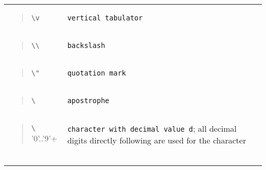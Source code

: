 \begin{longtable}[]{@{}ll@{}}
\begin{minipage}[t]{0.47\columnwidth}\raggedright
\begin{quote}
\texttt{\textbackslash{}v}
\end{quote}\strut
\end{minipage} & \begin{minipage}[t]{0.47\columnwidth}\raggedright
\texttt{vertical\ tabulator}\strut
\end{minipage}\tabularnewline
\begin{minipage}[t]{0.47\columnwidth}\raggedright
\begin{quote}
\texttt{\textbackslash{}\textbackslash{}}
\end{quote}\strut
\end{minipage} & \begin{minipage}[t]{0.47\columnwidth}\raggedright
\texttt{backslash}\strut
\end{minipage}\tabularnewline
\begin{minipage}[t]{0.47\columnwidth}\raggedright
\begin{quote}
\texttt{\textbackslash{}"}
\end{quote}\strut
\end{minipage} & \begin{minipage}[t]{0.47\columnwidth}\raggedright
\texttt{quotation\ mark}\strut
\end{minipage}\tabularnewline
\begin{minipage}[t]{0.47\columnwidth}\raggedright
\begin{quote}
\texttt{\textbackslash{}\textquotesingle{}}
\end{quote}\strut
\end{minipage} & \begin{minipage}[t]{0.47\columnwidth}\raggedright
\texttt{apostrophe}\strut
\end{minipage}\tabularnewline
\begin{minipage}[t]{0.47\columnwidth}\raggedright
\begin{quote}
\texttt{\textbackslash{}} '0'..'9'+
\end{quote}\strut
\end{minipage} & \begin{minipage}[t]{0.47\columnwidth}\raggedright
\texttt{character\ with\ decimal\ value\ d}; all decimal digits directly
following are used for the character\strut
\end{minipage}\tabularnewline
\begin{minipage}[t]{0.47\columnwidth}\raggedright
\begin{quote}

\end{quote}
\end{minipage}
\end{longtable}
